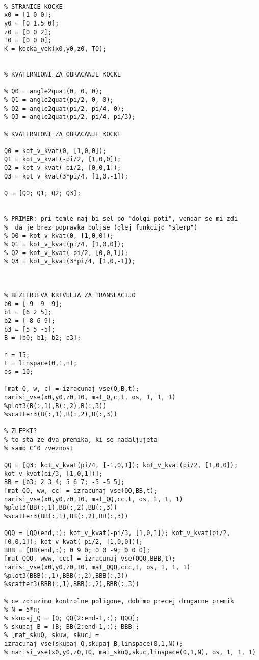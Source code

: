 \documentclass[12pt,a4paper,twoside]{article}
\theoremstyle{definition} %
\theoremstyle{plain} %
\numberwithin{equation}{section}  %
\begin{document}
\begin{lstlisting}[caption = {}]

\end{lstlisting}

\begin{lstlisting}[caption = {}]
% definicija kocke

% STRANICE KOCKE
x0 = [1 0 0];
y0 = [0 1.5 0];
z0 = [0 0 2];
T0 = [0 0 0];
K = kocka_vek(x0,y0,z0, T0);


% KVATERNIONI ZA OBRACANJE KOCKE

% Q0 = angle2quat(0, 0, 0);
% Q1 = angle2quat(pi/2, 0, 0);
% Q2 = angle2quat(pi/2, pi/4, 0);
% Q3 = angle2quat(pi/2, pi/4, pi/3);

% KVATERNIONI ZA OBRACANJE KOCKE

Q0 = kot_v_kvat(0, [1,0,0]);
Q1 = kot_v_kvat(-pi/2, [1,0,0]);
Q2 = kot_v_kvat(-pi/2, [0,0,1]);
Q3 = kot_v_kvat(3*pi/4, [1,0,-1]);

Q = [Q0; Q1; Q2; Q3];


% PRIMER: pri temle naj bi sel po "dolgi poti", vendar se mi zdi
%  da je brez popravka boljse (glej funkcijo "slerp")
% Q0 = kot_v_kvat(0, [1,0,0]);
% Q1 = kot_v_kvat(pi/4, [1,0,0]);
% Q2 = kot_v_kvat(-pi/2, [0,0,1]);
% Q3 = kot_v_kvat(3*pi/4, [1,0,-1]);



% BEZIERJEVA KRIVULJA ZA TRANSLACIJO
b0 = [-9 -9 -9];
b1 = [6 2 5];
b2 = [-8 6 9];
b3 = [5 5 -5];
B = [b0; b1; b2; b3];

n = 15;
t = linspace(0,1,n);
os = 10;

[mat_Q, w, c] = izracunaj_vse(Q,B,t);
narisi_vse(x0,y0,z0,T0, mat_Q,c,t, os, 1, 1, 1)
%plot3(B(:,1),B(:,2),B(:,3))
%scatter3(B(:,1),B(:,2),B(:,3))

% ZLEPKI?
% to sta ze dva premika, ki se nadaljujeta 
% samo C^0 zveznost

QQ = [Q3; kot_v_kvat(pi/4, [-1,0,1]); kot_v_kvat(pi/2, [1,0,0]); kot_v_kvat(pi/3, [1,0,1])]; 
BB = [b3; 2 3 4; 5 6 7; -5 -5 5];
[mat_QQ, ww, cc] = izracunaj_vse(QQ,BB,t);
narisi_vse(x0,y0,z0,T0, mat_QQ,cc,t, os, 1, 1, 1)
%plot3(BB(:,1),BB(:,2),BB(:,3))
%scatter3(BB(:,1),BB(:,2),BB(:,3))

QQQ = [QQ(end,:); kot_v_kvat(-pi/3, [1,0,1]); kot_v_kvat(pi/2, [0,0,1]); kot_v_kvat(-pi/2, [1,0,0])]; 
BBB = [BB(end,:); 0 9 0; 0 0 -9; 0 0 0];
[mat_QQQ, www, ccc] = izracunaj_vse(QQQ,BBB,t);
narisi_vse(x0,y0,z0,T0, mat_QQQ,ccc,t, os, 1, 1, 1)
%plot3(BBB(:,1),BBB(:,2),BBB(:,3))
%scatter3(BBB(:,1),BBB(:,2),BBB(:,3))

% ce zdruzimo kontrolne poligone, dobimo precej drugacne premik
% N = 5*n;
% skupaj_Q = [Q; QQ(2:end-1,:); QQQ];
% skupaj_B = [B; BB(2:end-1,:); BBB];
% [mat_skuQ, skuw, skuc] = izracunaj_vse(skupaj_Q,skupaj_B,linspace(0,1,N));
% narisi_vse(x0,y0,z0,T0, mat_skuQ,skuc,linspace(0,1,N), os, 1, 1, 1)
\end{lstlisting}
\end{document}
